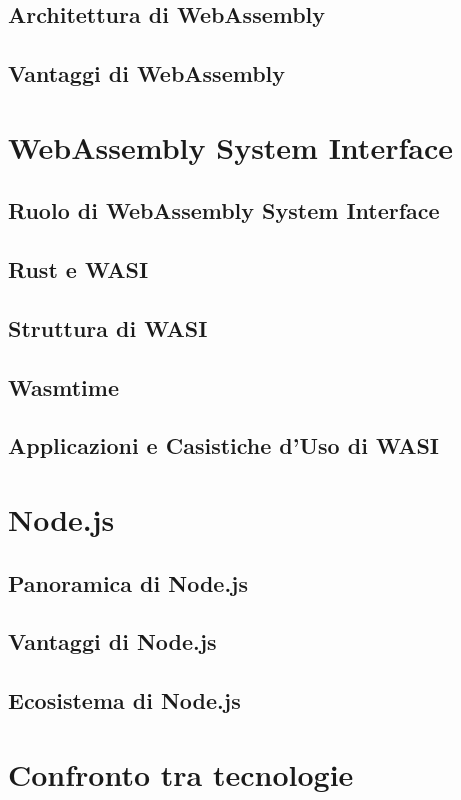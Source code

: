 \newpage
\subsection{Architettura di WebAssembly}
\subsection{Vantaggi di WebAssembly}

\newpage
\section{WebAssembly System Interface}
\label{sec:WASI}
\subsection{Ruolo di WebAssembly System Interface}
\subsection{Rust e WASI}
\subsection{Struttura di WASI}
\subsection{Wasmtime}
\subsection{Applicazioni e Casistiche d'Uso di WASI}

\newpage
\section{Node.js}
\label{sec:Node}
\subsection{Panoramica di Node.js}
\subsection{Vantaggi di Node.js}
\subsection{Ecosistema di Node.js}

\newpage
\section{Confronto tra tecnologie}
\label{sec:Confronto}
